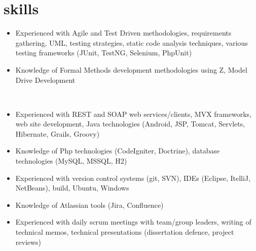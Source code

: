 \section{skills}
\begin{entrylist}
{}
{
\begin{minipage}[t]{\textwidth}
\begin{itemize}[topsep=0pt]
\item Experienced with Agile and Test Driven methodologies, requirements gathering, UML, testing strategies, static code analysis techniques, various testing frameworks (JUnit, TestNG, Selenium, PhpUnit)
\item Knowledge of Formal Methods development methodologies using Z, Model Drive Development
\end{itemize}
\end{minipage}
}


\\
{}
{
\begin{minipage}[t]{\textwidth}
\begin{itemize}[topsep=0pt]
\item Experienced with REST and SOAP web services/clients, MVX frameworks, web site development, Java technologies (Android, JSP, Tomcat, Servlets, Hibernate, Grails, Groovy)
\item Knowledge of Php technologies (CodeIgniter, Doctrine), database technologies (MySQL, MSSQL, H2)
\end{itemize}
\end{minipage}
}

{}
{
\begin{minipage}[t]{\textwidth}
\begin{itemize}[topsep=0pt]
\item Experienced with version control systems (git, SVN), IDEs (Eclipse, ItelliJ, NetBeans), build, Ubuntu, Windows
\item Knowledge of Atlassian tools (Jira, Confluence)
\end{itemize}
\end{minipage}
}

{}
{
\begin{minipage}[t]{\textwidth}
\begin{itemize}[topsep=0pt]
\item Experienced with daily scrum meetings with team/group leaders, writing of technical memos, technical presentations (dissertation defence, project reviews)
\end{itemize}
\end{minipage}
}


\end{entrylist}